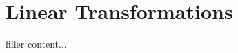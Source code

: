 \documentclass[../../templates/section]{subfiles}
\begin{document}
\section{Linear Transformations}\label{sec:linear-transformations}

filler content...
\end{document}
